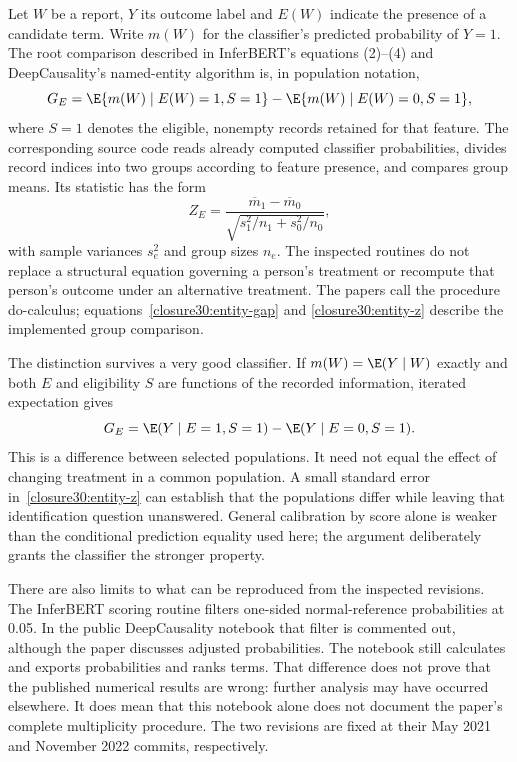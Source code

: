 Let $W$ be a report, $Y$ its outcome label and $E(W)$ indicate the presence of
a candidate term. Write $m(W)$ for the classifier's predicted probability of
$Y=1$. The root comparison described in InferBERT's equations (2)--(4) and
DeepCausality's named-entity algorithm is, in population notation,
\begin{equation}
 G_E=\E\{m(W)\mid E(W)=1,S=1\}
       -\E\{m(W)\mid E(W)=0,S=1\},
 \label{closure30:entity-gap}
\end{equation}
where $S=1$ denotes the eligible, nonempty records retained for that feature.
The corresponding source code reads already computed classifier
probabilities, divides record indices into two groups according to feature
presence, and compares group means. Its statistic has the form
\begin{equation}
 Z_E=\frac{\overline m_1-\overline m_0}
 {\sqrt{s_1^2/n_1+s_0^2/n_0}},
 \label{closure30:entity-z}
\end{equation}
with sample variances $s_e^2$ and group sizes $n_e$. The inspected routines
do not replace a structural equation governing a person's treatment or
recompute that person's outcome under an alternative treatment. The papers
call the procedure do-calculus; equations~\eqref{closure30:entity-gap} and
\eqref{closure30:entity-z} describe the implemented group comparison.
\citep[pp.~5--6, equations (2)--(6)]{closure30inferbert}
\citep[pp.~4--6, Algorithm 1]{closure30deepcausality}
\citep{closure30inferbertcode,closure30deepcausalitycode}

The distinction survives a very good classifier. If
$m(W)=\E(Y\mid W)$ exactly and both $E$ and eligibility $S$ are functions
of the recorded information, iterated expectation gives
\begin{equation}
 G_E=\E(Y\mid E=1,S=1)-\E(Y\mid E=0,S=1).
 \label{closure30:calibration-group}
\end{equation}
This is a difference between selected populations. It need not equal the
effect of changing treatment in a common population. A small standard error
in~\eqref{closure30:entity-z} can establish that the populations differ while
leaving that identification question unanswered. General calibration by
score alone is weaker than the conditional prediction equality used here;
the argument deliberately grants the classifier the stronger property.

There are also limits to what can be reproduced from the inspected revisions.
The InferBERT scoring routine filters one-sided normal-reference probabilities
at 0.05. In the public DeepCausality notebook that filter is commented out,
although the paper discusses adjusted probabilities. The notebook still
calculates and exports probabilities and ranks terms. That difference does
not prove that the published numerical results are wrong: further analysis
may have occurred elsewhere. It does mean that this notebook alone does not
document the paper's complete multiplicity procedure. The two revisions are
fixed at their May 2021 and November 2022 commits, respectively.
\citep{closure30inferbertcode,closure30deepcausalitycode}

